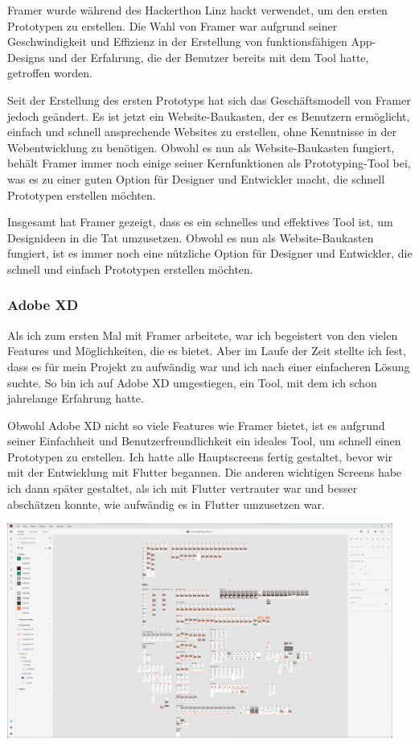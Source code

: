 Framer wurde während des Hackerthon Linz hackt verwendet, um den ersten Prototypen zu erstellen. Die Wahl von Framer war aufgrund seiner Geschwindigkeit und Effizienz in der Erstellung von funktionsfähigen App-Designs und der Erfahrung, die der Benutzer bereits mit dem Tool hatte, getroffen worden.

Seit der Erstellung des ersten Prototyps hat sich das Geschäftsmodell von Framer jedoch geändert. Es ist jetzt ein Website-Baukasten, der es Benutzern ermöglicht, einfach und schnell ansprechende Websites zu erstellen, ohne Kenntnisse in der Webentwicklung zu benötigen. Obwohl es nun als Website-Baukasten fungiert, behält Framer immer noch einige seiner Kernfunktionen als Prototyping-Tool bei, was es zu einer guten Option für Designer und Entwickler macht, die schnell Prototypen erstellen möchten.

Insgesamt hat Framer gezeigt, dass es ein schnelles und effektives Tool ist, um Designideen in die Tat umzusetzen. Obwohl es nun als Website-Baukasten fungiert, ist es immer noch eine nützliche Option für Designer und Entwickler, die schnell und einfach Prototypen erstellen möchten.

\subsubsection{Adobe XD}
Als ich zum ersten Mal mit Framer arbeitete, war ich begeistert von den vielen Features und Möglichkeiten, die es bietet. Aber im Laufe der Zeit stellte ich fest, dass es für mein Projekt zu aufwändig war und ich nach einer einfacheren Lösung suchte. So bin ich auf Adobe XD umgestiegen, ein Tool, mit dem ich schon jahrelange Erfahrung hatte.

Obwohl Adobe XD nicht so viele Features wie Framer bietet,
ist es aufgrund seiner Einfachheit und
Benutzerfreundlichkeit ein ideales Tool, um schnell einen
Prototypen zu erstellen. Ich hatte alle Hauptscreens
fertig gestaltet, bevor wir mit der Entwicklung mit Flutter
begannen. Die anderen wichtigen Screens habe ich dann
später gestaltet, als ich mit Flutter vertrauter war und
besser abschätzen konnte, wie aufwändig es in Flutter
umzusetzen war.

\includegraphics[width=0.95\textwidth]{pics/nochba-adobe-xd-protoype-screenshot.png}


